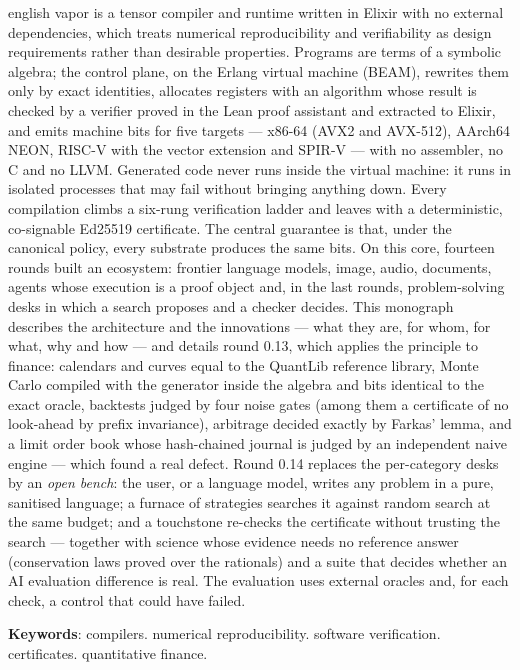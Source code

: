 \documentclass[
  12pt, openany, oneside, a4paper,
  chapter=TITLE, section=TITLE,
  english, brazil
]{abntex2}
\newcommand{\vapor}{\textsf{vapor}}
\begin{document}
\begin{resumo}[Abstract]
\begin{otherlanguage*}{english}
\vapor{} is a tensor compiler and runtime written in Elixir with no external dependencies, which treats numerical reproducibility and verifiability as design requirements rather than desirable properties. Programs are terms of a symbolic algebra; the control plane, on the Erlang virtual machine (BEAM), rewrites them only by exact identities, allocates registers with an algorithm whose result is checked by a verifier proved in the Lean proof assistant and extracted to Elixir, and emits machine bits for five targets --- x86-64 (AVX2 and AVX-512), AArch64 NEON, RISC-V with the vector extension and SPIR-V --- with no assembler, no C and no LLVM. Generated code never runs inside the virtual machine: it runs in isolated processes that may fail without bringing anything down. Every compilation climbs a six-rung verification ladder and leaves with a deterministic, co-signable Ed25519 certificate. The central guarantee is that, under the canonical policy, every substrate produces the same bits. On this core, fourteen rounds built an ecosystem: frontier language models, image, audio, documents, agents whose execution is a proof object and, in the last rounds, problem-solving desks in which a search proposes and a checker decides. This monograph describes the architecture and the innovations --- what they are, for whom, for what, why and how --- and details round 0.13, which applies the principle to finance: calendars and curves equal to the QuantLib reference library, Monte Carlo compiled with the generator inside the algebra and bits identical to the exact oracle, backtests judged by four noise gates (among them a certificate of no look-ahead by prefix invariance), arbitrage decided exactly by Farkas' lemma, and a limit order book whose hash-chained journal is judged by an independent naive engine --- which found a real defect. Round 0.14 replaces the per-category desks by an \emph{open bench}: the user, or a language model, writes any problem in a pure, sanitised language; a furnace of strategies searches it against random search at the same budget; and a touchstone re-checks the certificate without trusting the search --- together with science whose evidence needs no reference answer (conservation laws proved over the rationals) and a suite that decides whether an AI evaluation difference is real. The evaluation uses external oracles and, for each check, a control that could have failed.

\textbf{Keywords}: compilers. numerical reproducibility. software verification. certificates. quantitative finance.
\end{otherlanguage*}
\end{resumo}
\end{document}
